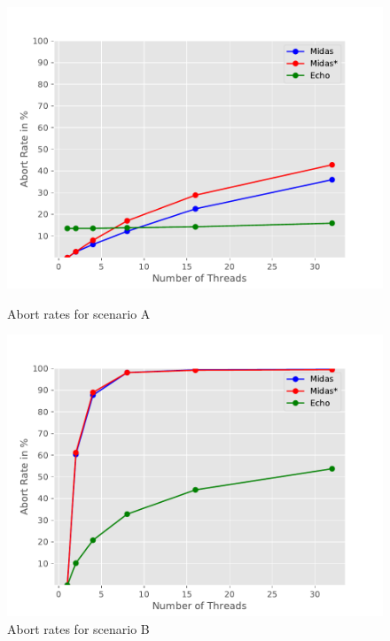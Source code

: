 
\begin{figure}
\begin{minipage}[l]{0.50\textwidth}
        \includegraphics[width=\textwidth]{figures/bench/ar-ss}
        \caption{Abort rates for scenario A}
\end{minipage}
\begin{minipage}[l]{0.50\textwidth}
        \includegraphics[width=\textwidth]{figures/bench/ar-sl}
        \caption{Abort rates for scenario B}
\end{minipage}


\end{figure}
